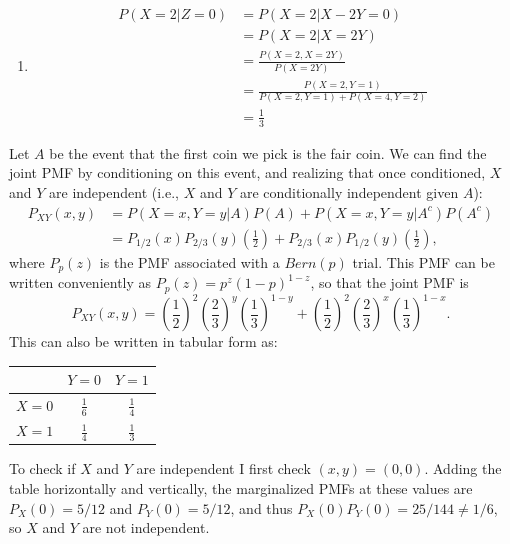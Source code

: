 \begin{problem}{2}
\begin{enumerate}
\item 
\begin{align*}
P(X=2|Z=0) & = P(X=2|X-2Y=0) \\
 & = P(X=2|X=2Y) \\
  & = \frac{P(X=2, X=2Y)}{P(X=2Y)} \\
    & = \frac{P(X=2, Y=1)}{P(X=2, Y=1)+P(X=4, Y=2)} \\
    & = \frac{1}{3}
\end{align*}

\end{enumerate}
\end{problem}

\begin{problem}{3}
Let $A$ be the event that the first coin we pick is the fair coin.  We can find the joint PMF by conditioning on this event, and realizing that once conditioned, $X$ and $Y$ are independent (i.e., $X$ and $Y$ are conditionally independent given $A$):
\begin{align*}
P_{XY}(x, y) &= P(X=x, Y=y|A)P(A)+P(X=x, Y=y|A^c)P(A^c) \\
&= P_{1/2}(x) P_{2/3}(y)\left(\frac{1}{2}\right)+P_{2/3}(x) P_{1/2}(y)\left(\frac{1}{2}\right),
\end{align*}
where $P_{p}(z)$ is the PMF associated with a $Bern(p)$ trial.  This PMF can be written conveniently as $P_{p}(z)=p^z(1-p)^{1-z}$, so that the joint PMF is
\begin{equation*}
P_{XY}(x, y) = \left( \frac{1}{2} \right)^2 \left( \frac{2}{3} \right)^y \left( \frac{1}{3} \right)^{1-y}+\left( \frac{1}{2} \right )^2 \left( \frac{2}{3} \right)^x \left( \frac{1}{3}\right)^{1-x}.
\end{equation*}
This can also be written in tabular form as:

\begin{center}
\bgroup
\def\arraystretch{2.5}
  \begin{tabular}{ | c | c | c |}
    \hline
     & $Y=0$ & $Y=1$ \\  \hline
    $X=0$ &$\frac{1}{6}$ & $\frac{1}{4}$ \\ \hline
    $X=1$ & $\frac{1}{4}$ & $\frac{1}{3}$ \\
    \hline
  \end{tabular}
  \egroup
\end{center}
\end{problem}
To check if $X$ and $Y$ are independent I first check $(x, y)=(0,0)$.  Adding the table horizontally and vertically, the marginalized PMFs at these values are $P_X(0) = 5/12$ and $P_Y(0) = 5/12$, and thus $P_X(0)P_Y(0) = 25/144 \neq 1/6$, so $X$ and $Y$ are not independent.

